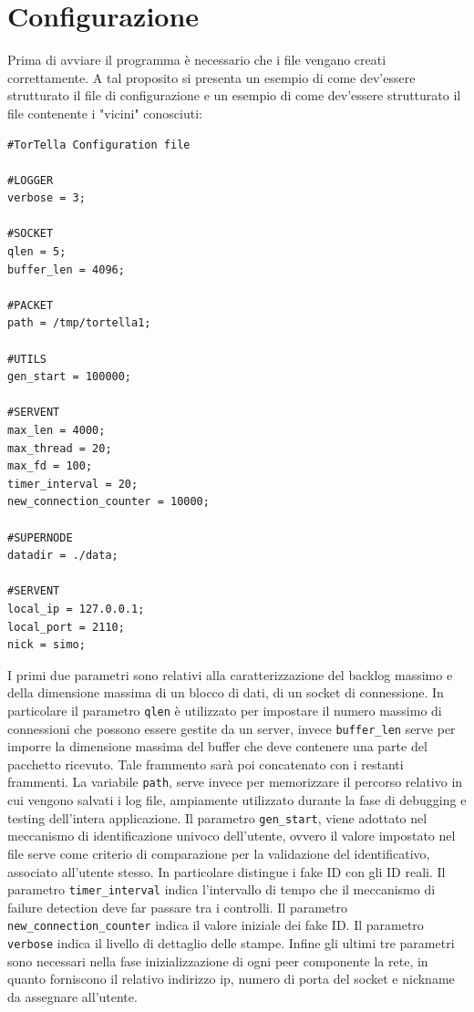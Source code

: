 \section{Configurazione}
Prima di avviare il programma è necessario che i file vengano creati correttamente. A tal proposito si presenta un esempio di come dev'essere strutturato il file di configurazione e un esempio di come dev'essere strutturato il file contenente i "vicini" conosciuti:
\begin{lstlisting}
#TorTella Configuration file

#LOGGER
verbose = 3;

#SOCKET
qlen = 5;
buffer_len = 4096;

#PACKET
path = /tmp/tortella1;

#UTILS
gen_start = 100000;

#SERVENT
max_len = 4000;
max_thread = 20;
max_fd = 100;
timer_interval = 20;
new_connection_counter = 10000;

#SUPERNODE
datadir = ./data;

#SERVENT
local_ip = 127.0.0.1;
local_port = 2110;
nick = simo;
\end{lstlisting}
I primi due parametri sono relativi alla caratterizzazione del backlog massimo e della dimensione massima di un blocco di dati, di un socket di connessione. In particolare il parametro \texttt{qlen} è utilizzato per impostare il numero massimo di  connessioni che possono essere gestite da un server, invece \texttt{buffer\_len} serve per imporre la dimensione massima del buffer che deve contenere una parte del pacchetto ricevuto. Tale frammento sarà poi concatenato con i restanti frammenti. La variabile \texttt{path}, serve invece per memorizzare il percorso relativo in cui vengono salvati i log file, ampiamente utilizzato durante la fase di debugging e testing dell'intera applicazione. Il parametro \texttt{gen\_start}, viene adottato nel meccanismo di identificazione univoco dell'utente, ovvero il valore impostato nel file serve come criterio di comparazione per la validazione del identificativo, associato all'utente stesso. In particolare distingue i fake ID con gli ID reali. Il parametro \texttt{timer\_interval} indica l'intervallo di tempo che il meccanismo di failure detection deve far passare tra i controlli. Il parametro \texttt{new\_connection\_counter} indica il valore iniziale dei fake ID. Il parametro \texttt{verbose} indica il livello di dettaglio delle stampe. Infine gli ultimi tre parametri sono necessari nella fase inizializzazione di ogni peer componente la rete, in quanto forniscono il relativo indirizzo ip, numero di porta del socket e nickname da assegnare all'utente.
